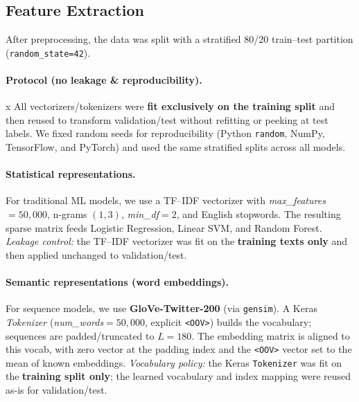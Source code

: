 \documentclass[10pt]{article}
\begin{document}
\subsection{Feature Extraction}
After preprocessing, the data was split with a stratified 80/20 train--test partition (\texttt{random\_state=42}).

\paragraph{Protocol (no leakage \& reproducibility).}x
All vectorizers/tokenizers were \textbf{fit exclusively on the training split} and then reused to transform
validation/test without refitting or peeking at test labels. We fixed random seeds for reproducibility
(Python \texttt{random}, NumPy, TensorFlow, and PyTorch) and used the same stratified splits across all models.

\paragraph{Statistical representations.}
For traditional ML models, we use a TF--IDF vectorizer with \textit{max\_features} $=50{,}000$, n-grams $(1,3)$, \textit{min\_df}$=2$, and English stopwords. The resulting sparse matrix feeds Logistic Regression, Linear SVM, and Random Forest.
\textit{Leakage control:} the TF--IDF vectorizer was fit on the \textbf{training texts only} and then applied
unchanged to validation/test.

\paragraph{Semantic representations (word embeddings).}
For sequence models, we use \textbf{GloVe-Twitter-200} (via \texttt{gensim}). A Keras \textit{Tokenizer} (\textit{num\_words}$=50{,}000$, explicit \texttt{<OOV>}) builds the vocabulary; sequences are padded/truncated to $L=180$. The embedding matrix is aligned to this vocab, with zero vector at the padding index and the \texttt{<OOV>} vector set to the mean of known embeddings.
\textit{Vocabulary policy:} the Keras \texttt{Tokenizer} was fit on the \textbf{training split only};
the learned vocabulary and index mapping were reused as-is for validation/test.
\end{document}
